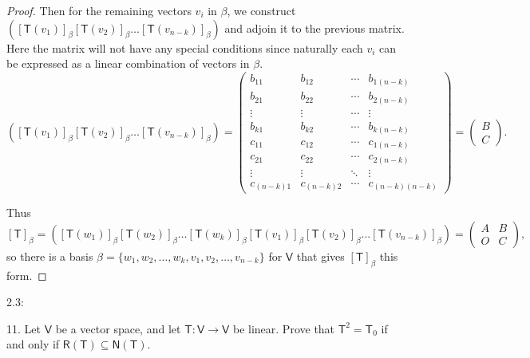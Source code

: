\documentclass[11pt]{article}
\newcommand{\br}[1]{\left(#1\right)}
\newcommand{\sbr}[1]{\left[#1\right]}
\newcommand{\cbr}[1]{\{#1\}}
\begin{document}
\begin{proof}
    Then for the remaining vectors $v_i$ in $\beta$, we construct $\br{\sbr{\mathsf{T}(v_1)}_{\beta} \sbr{\mathsf{T}(v_2)}_{\beta} \dots \sbr{\mathsf{T}(v_{n-k})}_{\beta}}$ and adjoin it to the previous matrix. Here the matrix will not have any special conditions since naturally each $v_i$ can be expressed as a linear combination of vectors in $\beta$. $$\br{\sbr{\mathsf{T}(v_1)}_{\beta} \sbr{\mathsf{T}(v_2)}_{\beta} \dots \sbr{\mathsf{T}(v_{n-k})}_{\beta}} = \begin{pmatrix}
        b_{11} & b_{12} & \cdots & b_{1(n-k)} \\
        b_{21} & b_{22} & \cdots & b_{2(n-k)} \\
        \vdots & \vdots & \cdots & \vdots \\
        b_{k1} & b_{k2} & \cdots & b_{k(n-k)} \\
        c_{11} & c_{12} & \cdots & c_{1(n-k)} \\
        c_{21} & c_{22} & \cdots & c_{2(n-k)} \\
        \vdots  & \vdots & \ddots & \vdots \\
        c_{(n-k)1} & c_{(n-k)2} & \cdots & c_{(n-k)(n-k)}
    \end{pmatrix} = \begin{pmatrix}
        B \\
        C
    \end{pmatrix}.$$

    Thus $$\sbr{\mathsf{T}}_{\beta} = \br{\sbr{\mathsf{T}(w_1)}_{\beta} \sbr{\mathsf{T}(w_2)}_{\beta} \dots \sbr{\mathsf{T}(w_k)}_{\beta} \sbr{\mathsf{T}(v_1)}_{\beta} \sbr{\mathsf{T}(v_2)}_{\beta} \dots \sbr{\mathsf{T}(v_{n-k})}_{\beta}} = \begin{pmatrix}
        A & B \\
        O & C
    \end{pmatrix},$$ so there is a basis $\beta = \cbr{w_1,w_2,\dots,w_k,v_1,v_2,\dots,v_{n-k}}$ for $\mathsf{V}$ that gives $\sbr{\mathsf{T}}_{\beta}$ this form.
\end{proof}
2.3: 

11. Let $\mathsf{V}$ be a vector space, and let $\mathsf{T} : \mathsf{V} \to \mathsf{V}$ be linear. Prove that $\mathsf{T}^2 = \mathsf{T}_0$ if and only if $\mathsf{R(T)} \subseteq \mathsf{N(T)}$. 
\end{document}
